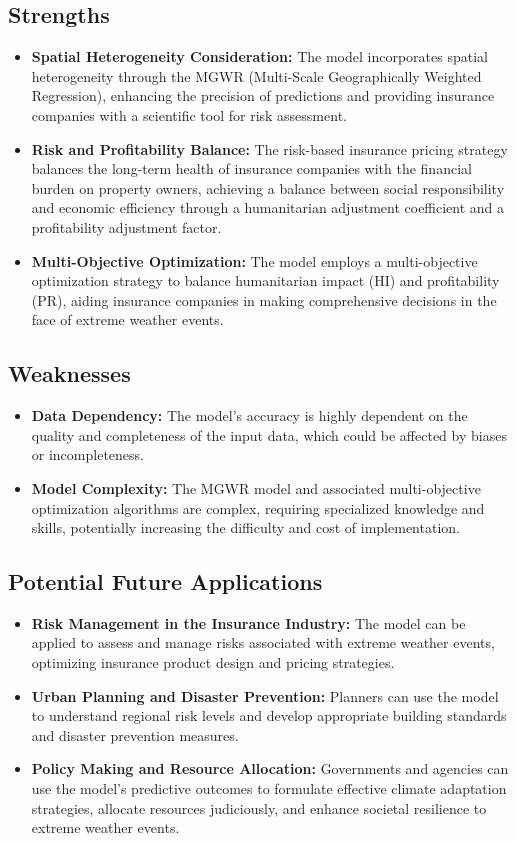 \documentclass[12pt]{article}
\begin{document}
\subsection{Strengths}
\begin{itemize}
	\item \textbf{Spatial Heterogeneity Consideration:} The model incorporates spatial heterogeneity through the MGWR (Multi-Scale Geographically Weighted Regression), enhancing the precision of predictions and providing insurance companies with a scientific tool for risk assessment.
        \item \textbf{Risk and Profitability Balance:} The risk-based insurance pricing strategy balances the long-term health of insurance companies with the financial burden on property owners, achieving a balance between social responsibility and economic efficiency through a humanitarian adjustment coefficient and a profitability adjustment factor.
        \item \textbf{Multi-Objective Optimization:} The model employs a multi-objective optimization strategy to balance humanitarian impact (HI) and profitability (PR), aiding insurance companies in making comprehensive decisions in the face of extreme weather events.
\end{itemize}
\subsection{Weaknesses}
\begin{itemize}
   \item \textbf{Data Dependency:} The model's accuracy is highly dependent on the quality and completeness of the input data, which could be affected by biases or incompleteness.
        \item \textbf{Model Complexity:} The MGWR model and associated multi-objective optimization algorithms are complex, requiring specialized knowledge and skills, potentially increasing the difficulty and cost of implementation.
\end{itemize}
\subsection{Potential Future Applications}
\begin{itemize}
        \item \textbf{Risk Management in the Insurance Industry:} The model can be applied to assess and manage risks associated with extreme weather events, optimizing insurance product design and pricing strategies.
        \item \textbf{Urban Planning and Disaster Prevention:} Planners can use the model to understand regional risk levels and develop appropriate building standards and disaster prevention measures.
        \item \textbf{Policy Making and Resource Allocation:} Governments and agencies can use the model's predictive outcomes to formulate effective climate adaptation strategies, allocate resources judiciously, and enhance societal resilience to extreme weather events.
    \end{itemize}
\end{document}
